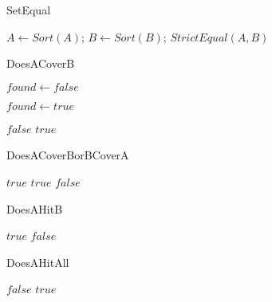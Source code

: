 \begin{algorithm}
	\caption{SetEqual}\label{SetEqual}
	\begin{algorithmic}[1]
		\State $A \gets Sort(A)$;
		\State $B \gets Sort(B)$;
		\State \Return $StrictEqual(A,B)$
		\EndFunction
	\end{algorithmic}
\end{algorithm}

\begin{algorithm}
	\caption{DoesACoverB}\label{DoesACoverB}
	\begin{algorithmic}[1]
		\State $found \gets false$

		\State $found \gets true$
		\EndIf
		\EndFor

		\State \Return $false$
		\EndIf
		\EndFor
		\State \Return $true$
		\EndFunction
	\end{algorithmic}
\end{algorithm}

\begin{algorithm}
	\caption{DoesACoverBorBCoverA}\label{DoesACoverBorBCoverA}
	\begin{algorithmic}[1]
		\State \Return $true$
		\EndIf
		\State \Return $true$
		\EndIf
		\State \Return $false$
		\EndFunction
	\end{algorithmic}
\end{algorithm}

\begin{algorithm}
	\caption{DoesAHitB}\label{DoesAHitB}
	\begin{algorithmic}[1]
		\State \Return $true$
		\EndIf
		\EndFor
		\EndFor
		\State \Return $false$
		\EndFunction
	\end{algorithmic}
\end{algorithm}

\begin{algorithm}
	\caption{DoesAHitAll}\label{DoesAHitAll}
	\begin{algorithmic}[1]
		\State \Return $false$
		\EndIf
		\EndFor
		\State \Return $true$
		\EndFunction
	\end{algorithmic}
\end{algorithm}

